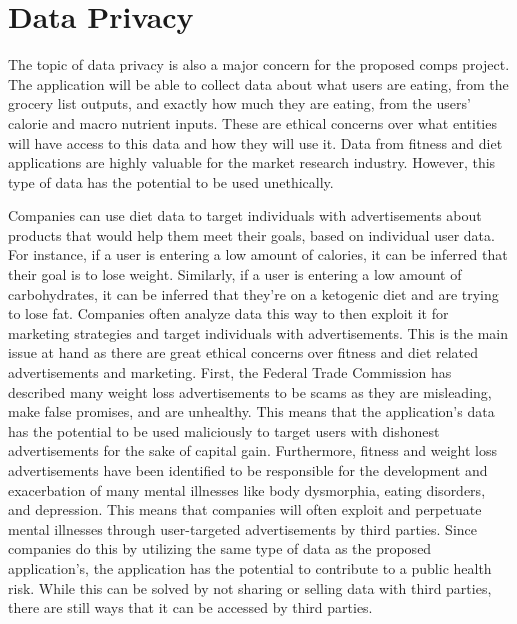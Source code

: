 \documentclass[10pt,twocolumn]{article}
\begin{document}
\section{Data Privacy}
The topic of data privacy is also a major concern for the proposed comps project. The application will be able to collect data about what users are eating, from the grocery list outputs, and exactly how much they are eating, from the users’ calorie and macro nutrient inputs. These are ethical concerns over what entities will have access to this data and how they will use it. Data from fitness and diet applications are highly valuable for the market research industry. However, this type of data has the potential to be used unethically. 

Companies can use diet data to target individuals with advertisements about products that would help them meet their goals, based on individual user data. For instance, if a user is entering a low amount of calories, it can be inferred that their goal is to lose weight. Similarly, if a user is entering a low amount of carbohydrates, it can be inferred that they’re on a ketogenic diet and are trying to lose fat. Companies often analyze data this way to then exploit it for marketing strategies and target individuals with advertisements.\cite{privacy international} This is the main issue at hand as there are great ethical concerns over fitness and diet related advertisements and marketing. First, the Federal Trade Commission has described many weight loss advertisements to be scams as they are misleading, make false promises, and are unhealthy.\cite{hebert_hernandez_perkins_puig_2022} This means that the application’s data has the potential to be used maliciously to target users with dishonest advertisements for the sake of capital gain. Furthermore, fitness and weight loss advertisements have been identified to be responsible for the development and exacerbation of many mental illnesses like body dysmorphia, eating disorders, and depression.\cite{shukla_2017} This means that companies will often exploit and perpetuate mental illnesses through user-targeted advertisements by third parties. Since companies do this by utilizing the same type of data as the proposed application’s, the application has the potential to contribute to a public health risk. While this can be solved by not sharing or selling data with third parties, there are still ways that it can be accessed by third parties.
\end{document}
